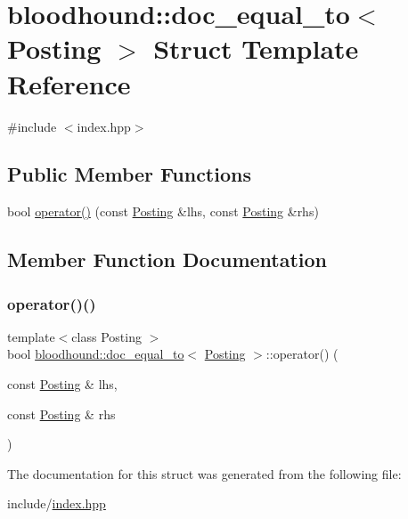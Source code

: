 \hypertarget{structbloodhound_1_1doc__equal__to}{}\section{bloodhound\+:\+:doc\+\_\+equal\+\_\+to$<$ Posting $>$ Struct Template Reference}
\label{structbloodhound_1_1doc__equal__to}


{\ttfamily \#include $<$index.\+hpp$>$}

\subsection*{Public Member Functions}
\begin{DoxyCompactItemize}
\item 
bool \mbox{\hyperlink{structbloodhound_1_1doc__equal__to_a5a8e28107bb693527fa4c513b3678b1b}{operator()}} (const \mbox{\hyperlink{structbloodhound_1_1Posting}{Posting}} \&lhs, const \mbox{\hyperlink{structbloodhound_1_1Posting}{Posting}} \&rhs)
\end{DoxyCompactItemize}


\subsection{Member Function Documentation}
\mbox{\label{structbloodhound_1_1doc__equal__to_a5a8e28107bb693527fa4c513b3678b1b}} 
\subsubsection{\texorpdfstring{operator()()}{operator()()}}
{\footnotesize\ttfamily template$<$class Posting $>$ \\
bool \mbox{\hyperlink{structbloodhound_1_1doc__equal__to}{bloodhound\+::doc\+\_\+equal\+\_\+to}}$<$ \mbox{\hyperlink{structbloodhound_1_1Posting}{Posting}} $>$\+::operator() (\begin{DoxyParamCaption}\item[{const \mbox{\hyperlink{structbloodhound_1_1Posting}{Posting}} \&}]{lhs,  }\item[{const \mbox{\hyperlink{structbloodhound_1_1Posting}{Posting}} \&}]{rhs }\end{DoxyParamCaption})\hspace{0.3cm}{\ttfamily [inline]}}



The documentation for this struct was generated from the following file\+:\begin{DoxyCompactItemize}
\item 
include/\mbox{\hyperlink{index_8hpp}{index.\+hpp}}\end{DoxyCompactItemize}
